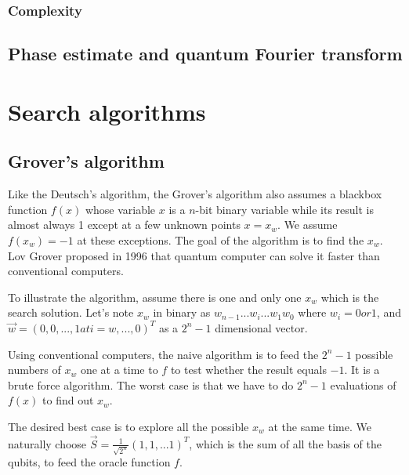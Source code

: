\documentclass[oneside, letter, 12pt]{book}
\begin{document}
\subsection{Complexity}

\section{Phase estimate and quantum Fourier transform}

\chapter{Search algorithms}
\section{Grover's algorithm}
Like the Deutsch's algorithm, the Grover's algorithm also assumes a blackbox function $f(x)$ whose variable $x$ is a $n$-bit binary variable while its result is almost always 1 except at a few unknown points $x=x_w$. We assume $f(x_w)=-1$ at these exceptions. The goal of the algorithm is to find the $x_w$. Lov Grover proposed in 1996 that quantum computer can solve it faster than conventional computers.

To illustrate the algorithm, assume there is one and only one $x_w$ which is the search solution. Let's note $x_w$ in binary as $w_{n-1}...w_i...w_1 w_0$ where $w_i = 0 or 1$,
and $\Vec{w} = (0, 0, ..., 1 at i=w, ..., 0)^T$ as a $2^n-1$ dimensional vector.

Using conventional computers, the naive algorithm is to feed the $2^n -1$ possible numbers of $x_w$ one at a time to $f$ to test whether the result equals $-1$. It is a brute force algorithm. The worst case is that we have to do $2^n-1$ evaluations of $f(x)$ to find out $x_w$.

The desired best case is to explore all the possible $x_w$ at the same time. We naturally choose $\vec{S} = \frac 1 {\sqrt{2^n}} (1, 1, ...1)^T$, which is the sum of all the basis of the qubits, to feed the oracle function $f$.
\end{document}
